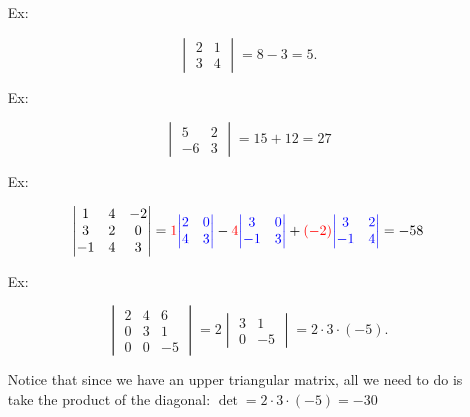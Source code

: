 \documentclass[reqno]{amsart}
\theoremstyle{definition}
\begin{document}
\begin{enumerate}

\item[Ex:  ] 

\begin{equation*}
\begin{vmatrix}
2 & 1\\
3 & 4
\end{vmatrix} = 8 - 3 = 5.
\end{equation*}

\item[Ex:  ]

\begin{equation*}
\begin{vmatrix}
5 & 2\\
-6 & 3
\end{vmatrix} = 15 + 12 = 27
\end{equation*}

\item[Ex:  ]  

\begin{equation*}
\begin{vmatrix}
1 & 4 & -2\\
3 & 2 & 0\\
-1 & 4 & 3
\end{vmatrix} = {\color{red}1}{\color{blue}\begin{vmatrix}
2 & 0\\
4 & 3
\end{vmatrix}}
-  {\color{red}4}{\color{blue}\begin{vmatrix}
3 & 0\\
-1 & 3
\end{vmatrix}} + {\color{red}(-2)}{\color{blue}\begin{vmatrix}
3 & 2\\
-1 & 4
\end{vmatrix}} = -58
\end{equation*}

\item[Ex:  ]  

\begin{equation*}
\begin{vmatrix}
2 & 4 & 6\\
0 & 3 & 1\\
0 & 0 & -5
\end{vmatrix} = 2\begin{vmatrix}
3 & 1\\
0 & -5
\end{vmatrix} = 2\cdot 3\cdot (-5).
\end{equation*}

Notice that since we have an upper triangular matrix, all we need to do is take the product of the diagonal: $\det = 2\cdot 3\cdot (-5) = -30$

\end{enumerate}
\end{document}
